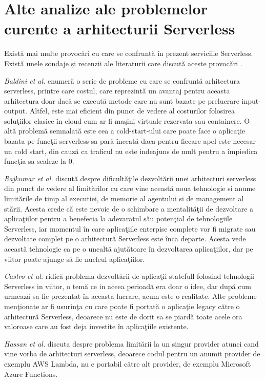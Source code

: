 \documentclass[a4paper,12pt]{report}
\begin{document}
\section{Alte analize ale problemelor curente a arhitecturii Serverless}
\quad Există mai multe provocări cu care se confruntă în prezent serviciile Serverless. Există unele sondaje și recenzii ale literaturii care discută aceste provocări \cite{baldini2017,rajkumar2017,paul2019,hassan2017,jonas2019}.
\par\emph{Baldini et al.} \cite{baldini2017} enumeră o serie de probleme cu care se confruntă arhitectura serverless, printre care costul, care reprezintă un avantaj pentru aceasta arhitectura doar dacă se execută metode care nu sunt bazate pe prelucrare input-output. Altfel, este mai eficient din punct de vedere al costurilor folosirea soluţiilor clasice în cloud cum ar fi maşini virtuale rezervata sau containere. O altă problemă semnalată este cea a cold-start-ului care poate face o aplicaţie bazata pe funcţii serverless sa pară înceată daca pentru fiecare apel este necesar un cold start, din cauză ca traficul nu este indeajuns de mult pentru a împiedica funcţia sa scaleze la 0. 
\par\emph{Rajkumar et al.} \cite{rajkumar2017} discută despre dificultăţile dezvoltării unei arhitecturi serverless din punct de vedere al limitărilor cu care vine această noua tehnologie si anume limitările de timp al executiei, de memorie al agentului si de management al stării. Acesta crede că este nevoie de o schimbare a mentalităţii de dezvoltare a aplicaţiilor pentru a benefecia la adevaratul său potenţial de tehnologiile Serverless, iar momentul în care aplicaţiile enterpise complete vor fi migrate sau dezvoltate complet pe o arhitectură Serverless este înca departe. Acesta vede această tehnologie ca pe o unealtă ajutătoare în dezvoltarea aplicaţiilor, dar pe viitor poate ajunge să fie nucleul aplicaţiilor.  
\par\emph{Castro et al.} \cite{paul2019} ridică problema dezvoltării de aplicaţii statefull folosind tehnologii Serverless in viitor, o temă ce in aceea perioadă era doar o idee, dar după cum urmează sa fie prezentat în aceasta lucrare, acum este o realitate. Alte probleme menţionate ar fi usurinţa cu care poate fi portată o aplicaţie legacy către o arhitectură Serverless, deoarece nu este de dorit sa se piardă toate acele ora valoroase care au fost deja investite în aplicaţiile existente. 
\par\emph{Hassan et al.} \cite{hassan2017} discuta despre problema limitării la un singur provider atunci cand vine vorba de arhitecturi serverless, deoarece codul pentru un anumit provider de exemplu AWS Lambda, nu e portabil către alt provider, de exemplu Microsoft Azure Functions. 
\end{document}
